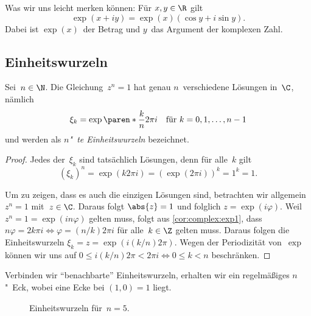 \documentclass[a4paper]{article}
\begin{document}
\begin{remark}
    Was wir uns leicht merken können: Für $x,y \in \R$ gilt
    \begin{equation*}
        \exp(x+iy) = \exp(x)(\cos y+i\sin y).
    \end{equation*}
    Dabei ist $\exp(x)$~der Betrag und $y$~das Argument der komplexen Zahl.
\end{remark}

\subsection{Einheitswurzeln}

\begin{theorem}[Einheitswurzeln]
    Sei~$n \in \N$. Die Gleichung~$z^n = 1$ hat genau $n$~verschiedene Lösungen in~$\C$, nämlich
    \begin{equation*}
        \xi_k = \exp\paren*{\frac{k}{n}2\pi i} \quad\text{für } k = 0, 1,\dots,n-1
    \end{equation*}
    und werden als \emph{$n$"~te Einheitswurzeln} bezeichnet.
\end{theorem}

\begin{proof}
    Jedes der~$\xi_k$ sind tatsächlich Lösungen, denn für alle~$k$ gilt
    \begin{equation*}
        (\xi_k)^n = \exp(k2\pi i) = (\exp(2\pi i))^k = 1^k = 1.
    \end{equation*}

    Um zu zeigen, dass es auch die einzigen Lösungen sind, betrachten wir allgemein $z^n = 1$ mit~$z \in \C$. Daraus folgt $\abs{z} = 1$ und folglich $z = \exp(i\varphi)$. Weil $z^n = 1 = \exp(in\varphi)$ gelten muss, folgt aus \cref{cor:complex:exp1}, dass $n\varphi = 2k\pi i \iff \varphi = (n/k)2\pi i$ für alle~$k \in \Z$ gelten muss. Daraus folgen die Einheitswurzeln $\xi_k = z = \exp(i(k/n)2\pi)$. Wegen der Periodizität von~$\exp$ können wir uns auf $0 \leq i(k/n)2\pi < 2\pi i \iff 0 \leq k < n$ beschränken.
\end{proof}

Verbinden wir "`benachbarte"' Einheitswurzeln, erhalten wir ein regelmäßiges $n$"~Eck, wobei eine Ecke bei $(1, 0) = 1$ liegt.

\begin{figure}
    \caption{Einheitswurzeln für~$n = 5$.}
\end{figure}
\end{document}
